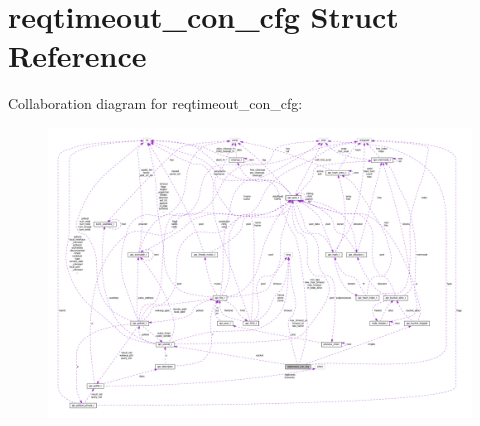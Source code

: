 \hypertarget{structreqtimeout__con__cfg}{}\section{reqtimeout\+\_\+con\+\_\+cfg Struct Reference}
\label{structreqtimeout__con__cfg}


Collaboration diagram for reqtimeout\+\_\+con\+\_\+cfg\+:
\nopagebreak
\begin{figure}[H]
\begin{center}
\leavevmode
\includegraphics[width=350pt]{structreqtimeout__con__cfg__coll__graph}
\end{center}
\end{figure}

